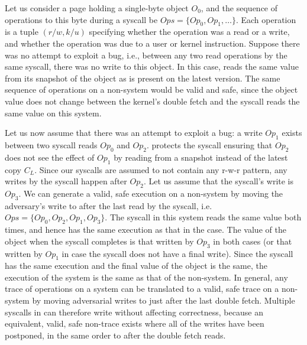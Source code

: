 \documentclass[letterpaper,twocolumn,10pt, anonymous]{article}
\begin{document}

Let us consider a page holding a single-byte object $O_0$, and the 
sequence of operations to this byte during a \tiktok syscall be 
$Ops = \{Op_0, Op_1, \dots \}$. 
Each operation is a tuple $(r/w, k/u)$ specifying whether the 
operation was a read or a write, and whether the operation was due to 
a user or kernel instruction.
Suppose there was no attempt to exploit a \tocttou bug, i.e., between
any two read operations by the same syscall, there was no write to 
this object.
In this case, \tiktok reads the same value from its snapshot of the 
object as is present on the latest version. 
The same sequence of operations on a non-\tiktok system would be valid and
safe, since the object value does not change between the kernel's double 
fetch and the syscall reads the same value on this system.

Let us now assume that there was an attempt to exploit a \tocttou bug:
a write $Op_1$ exists between two syscall reads $Op_0$ and $Op_2$.
\tiktok protects the syscall ensuring that $Op_2$ does not see the 
effect of $Op_1$ by reading from a snapshot instead of the latest 
copy $C_L$. 
Since our syscalls are assumed to not contain any r-w-r pattern, 
any writes by the syscall happen after $Op_2$.
Let us assume that the syscall's write is $Op_3$.
We can generate a valid, safe execution on a non-\tiktok system 
by moving the adversary's write to after the last read by the 
syscall, i.e. $Ops = \{Op_0, Op_2, Op_1, Op_3\}$.
The syscall in this system reads the same value both times, and 
hence has the same execution as that in the \tiktok case.
The value of the object when the syscall completes is that 
written by $Op_3$ in both cases (or that written by $Op_1$ in 
case the syscall does not have a final write).
Since the syscall has the same execution and the final value of 
the object is the same, the execution of the \tiktok system 
is the same as that of the non-\tiktok system.
In general, any trace of operations on a \tiktok system can 
be translated  to a valid, safe trace on a non-\tiktok system 
by moving adversarial writes to just after the last
double fetch. %
Multiple syscalls in \tiktok can therefore write without affecting 
correctness, because an equivalent, valid, safe non-\tiktok trace 
exists where all of the writes have been postponed, in the same order 
to after the double fetch reads. 
\end{document}

